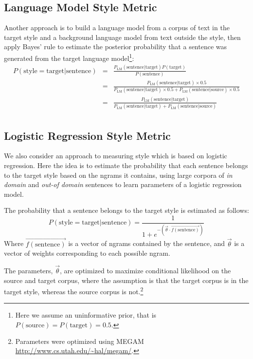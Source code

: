 \documentclass[10pt,a5paper,twoside]{article}
\begin{document}
\subsection{Language Model Style Metric}
Another approach is to build a language model from a corpus of text in the target style and a background language model from text outside the style, then apply Bayes' rule to estimate
the posterior probability that a sentence was generated from the target language model\footnote{
Here we assume an uninformative prior, that is $P(\text{source}) = P(\text{target}) = 0.5$.
}:
\begin{eqnarray*}
P(\text{style}=\text{target}|\text{sentence}) 
& = & \frac{P_\text{LM}(\text{sentence}|\text{target}) P(\text{target})}{P(\text{sentence})} \\
& = & \frac{P_\text{LM}(\text{sentence}|\text{target}) \times 0.5}{P_\text{LM}(\text{sentence}|\text{target}) \times 0.5 + P_\text{LM}(\text{sentence}|\text{source}) \times 0.5} \\
& = & \frac{P_\text{LM}(\text{sentence}|\text{target})}{P_\text{LM}(\text{sentence}|\text{target}) + P_\text{LM}(\text{sentence}|\text{source})} \\
\end{eqnarray*}

\subsection{Logistic Regression Style Metric}
We also consider an approach to measuring style which is based on logistic regression.
Here the idea is to estimate the probability that each
sentence belongs to the target style based on the ngrams it contains, using large corpora of \emph{in domain} and \emph{out-of domain} sentences to learn  parameters of a logistic regression model.

The probability that a sentence belongs to the target style is estimated as follows:
\[
P(\text{style} = \text{target}|\text{sentence}) = \frac{1}{1 + e^{-\left( \vec{\theta} \cdot \vec{f(\text{sentence})} \right)}}
\]
Where $\vec{f(\text{sentence})}$ is a vector of ngrams contained by the sentence, and $\vec{\theta}$ is a vector of weights corresponding to each possible ngram.

The parameters, $\vec{\theta}$, are optimized to maximize conditional likelihood on the source and target corpus, where the assumption is that the target corpus
is in the target style, whereas the source corpus is not.\footnote{
  Parameters were optimized using MEGAM \url{http://www.cs.utah.edu/~hal/megam/}.
}
\end{document}
